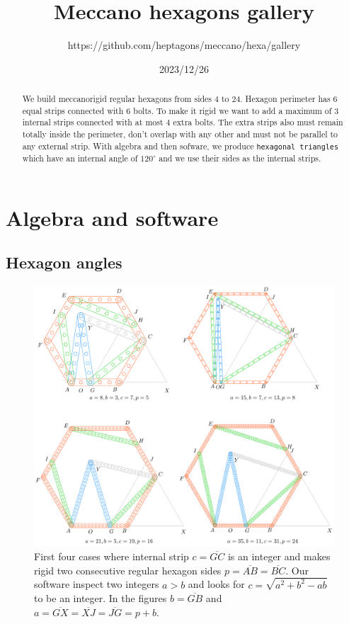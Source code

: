 \documentclass[11pt]{article}
\title{Meccano hexagons gallery}
\author{https://github.com/heptagons/meccano/hexa/gallery}
\date{2023/12/26}
\begin{document}
\maketitle
\begin{abstract}
We build meccano\meccanoref rigid regular hexagons from sides $4$ to $24$. Hexagon perimeter has $6$ equal strips connected with $6$ bolts. To make it rigid we want to add a maximum of $3$ internal strips connected with at most $4$ extra bolts. The extra strips also must remain totally inside the perimeter, don't overlap with any other and must not be parallel to any external strip. With algebra and then sofware, we produce \texttt{hexagonal triangles} which have an internal angle of $120^\circ$ and we use their sides as the internal strips.
\end{abstract}

\section{Algebra and software}

\subsection{Hexagon angles}

\begin{figure}[h]
\centering
\includegraphics[scale=0.9]{build/hexa-builder-a}
\caption{First four cases where internal strip $c = \overline{GC}$ is an integer and makes rigid two consecutive regular hexagon sides $p = \overline{AB} = \overline{BC}$. Our software inspect two integers $a > b$ and looks for $c = \sqrt{a^2+b^2-ab}$ to be an integer. In the figures $b = \overline{GB}$ and $a = \overline{GX} = \overline{XJ} = \overline{JG} = p + b$. }
\label{fig:builder-a}
\end{figure}
\end{document}
